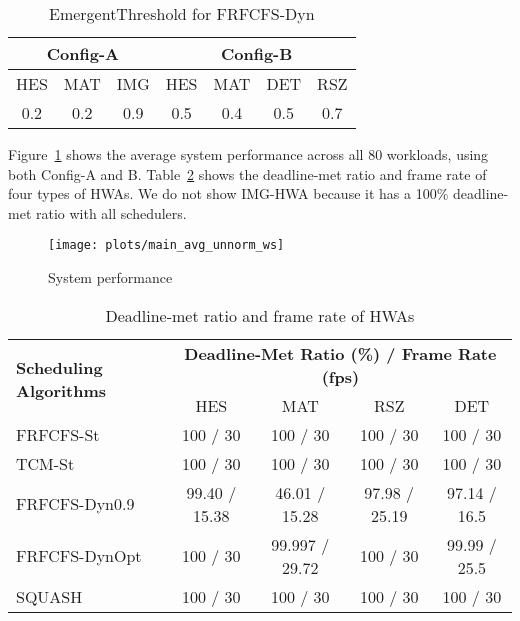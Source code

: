 \documentclass[10pt,letterpaper]{article}
\begin{document}
\begin{table}[h!]
\scriptsize
  \centering
  \begin{tabular}{|c|c|c|c|c|c|c|}
    \hline
    \multicolumn{3}{|c|}{Config-A} & \multicolumn{4}{c|}{Config-B} \\
    \hline
    HES & MAT & IMG & HES & MAT & DET & RSZ \\
    \hline
    0.2 & 0.2 & 0.9 & 0.5 & 0.4 & 0.5 & 0.7 \\
    \hline
  \end{tabular}
  \vspace{-2mm}
  \caption{EmergentThreshold for FRFCFS-Dyn}
  \label{tab:emergent_threshold}
  \vspace{-3mm}
\end{table}






Figure~\ref{plot:average_performance} shows the
average system performance across all 80 workloads, using both
Config-A and B. Table~\ref{tab:average_hwa_performance} shows the deadline-met
ratio and frame rate of four types of HWAs. We do not show IMG-HWA because it
has a 100\% deadline-met ratio with all schedulers.


\begin{figure}[ht!]
  \centering
  \texttt{[image: plots/main\_avg\_unnorm\_ws]}
\caption{System performance}
  \label{plot:average_performance}
\end{figure}





\begin{table}[h]
\footnotesize
\centering
\setlength{\tabcolsep}{.60em}
    \begin{tabular}{lcccc}
      \toprule
\multirow{2}{*}{\textbf{Scheduling Algorithms}} &
      \multicolumn{4}{c}{\textbf{Deadline-Met Ratio (\%) / Frame Rate (fps)}} \\
       & HES & MAT & RSZ & DET \\
      \midrule

    FRFCFS-St & 100 / 30 & 100 / 30 & 100 / 30 & 100 / 30 \\
    TCM-St & 100 / 30 & 100 / 30 & 100 / 30 & 100 / 30 \\
    FRFCFS-Dyn0.9 & 99.40 / 15.38 & 46.01 / 15.28 & 97.98 / 25.19 & 97.14 / 16.5 \\
    FRFCFS-DynOpt & 100 / 30 & 99.997 / 29.72 & 100 / 30 & 99.99 / 25.5 \\
SQUASH & 100 / 30 & 100 / 30 & 100 / 30 & 100 / 30 \\

      \bottomrule
    \end{tabular}
\vspace{-2mm}
\caption{Deadline-met ratio and frame rate of HWAs}
\label{tab:average_hwa_performance}\end{table}
\end{document}
